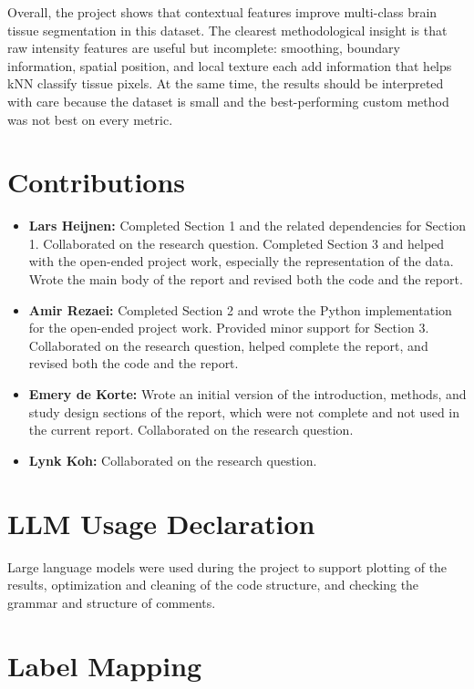 \documentclass[10pt,a4paper,twoside]{article}
\begin{document}
Overall, the project shows that contextual features improve multi-class brain tissue segmentation in this dataset. The clearest methodological insight is that raw intensity features are useful but incomplete: smoothing, boundary information, spatial position, and local texture each add information that helps kNN classify tissue pixels. At the same time, the results should be interpreted with care because the dataset is small and the best-performing custom method was not best on every metric.

\section{Contributions}

\begin{itemize}
    \item \textbf{Lars Heijnen:} Completed Section 1 and the related dependencies for Section 1. Collaborated on the research question. Completed Section 3 and helped with the open-ended project work, especially the representation of the data. Wrote the main body of the report and revised both the code and the report.

    \item \textbf{Amir Rezaei:} Completed Section 2 and wrote the Python implementation for the open-ended project work. Provided minor support for Section 3. Collaborated on the research question, helped complete the report, and revised both the code and the report.

    \item \textbf{Emery de Korte:} Wrote an initial version of the introduction, methods, and study design sections of the report, which were not complete and not used in the current report. Collaborated on the research question.

    \item \textbf{Lynk Koh:} Collaborated on the research question.
\end{itemize}

\section{LLM Usage Declaration}

Large language models were used during the project to support plotting of the results, optimization and cleaning of the code structure, and checking the grammar and structure of comments.

\appendix

\section{Label Mapping}
\label{app:label-mapping}
\end{document}
